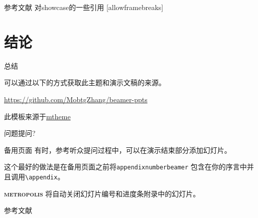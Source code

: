 \documentclass[12pt,aspectratio=169]{beamer}
\newcommand{\themename}{\textbf{\textsc{metropolis}}\xspace}
\begin{document}
\begin{frame}{参考文献}
  对showcase的一些引用 [allowframebreaks] \cite{knuth92,ConcreteMath,Simpson,Er01,greenwade93}
\end{frame}

\section{结论}

\begin{frame}{总结}

  可以通过以下的方式获取此主题和演示文稿的来源。

  \begin{center}\url{https://github.com/MobtgZhang/beamer-ppts}\end{center}

  此模板来源于\href{https://github.com/matze/mtheme}{mtheme}

  \begin{center}\ccbysa\end{center}

\end{frame}

{
\begin{frame}[standout]
  问题提问?
\end{frame}
}

\appendix

\begin{frame}[fragile]{备用页面}
  有时，参考听众提问过程中，可以在演示结束部分添加幻灯片。

  这个最好的做法是在备用页面之前将\verb|appendixnumberbeamer|
  包含在你的序言中并且调用\verb|\appendix|。

  \themename 将自动关闭幻灯片编号和进度条附录中的幻灯片。
\end{frame}

\begin{frame}[allowframebreaks]{参考文献}

  
  

\end{frame}
\end{document}
